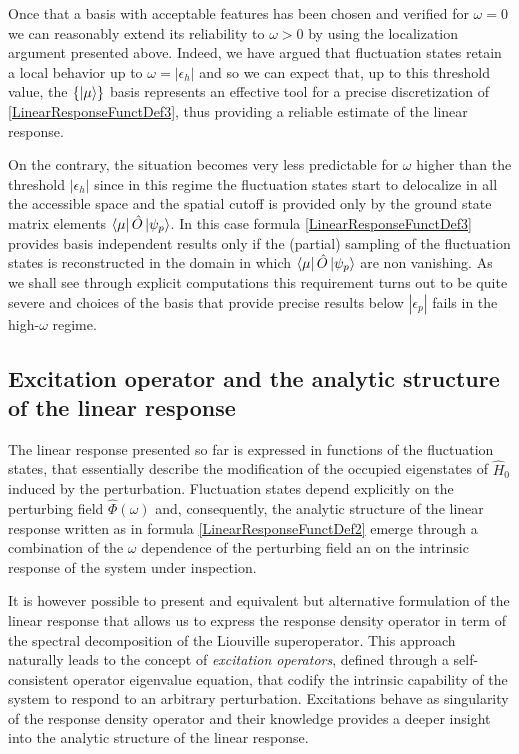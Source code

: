 \documentclass[a4paper]{article}
\newcommand{\eps}{\epsilon}
\newcommand{\op}[1]{\hat {#1}}
\newcommand{\hnot}{\op{H}_0}
\begin{document}
Once that a basis with acceptable features has been chosen and verified for $\omega=0$ we can reasonably extend its reliability to $\omega>0$ by using the localization argument presented above. 
Indeed, we have argued that fluctuation states retain a local behavior up to $\omega=|\eps_h|$ and so we can expect that, up to this threshold value, the $\{\ket{\mu}\}$ basis represents an 
effective tool for a precise discretization of \eqref{LinearResponseFunctDef3}, thus providing a reliable estimate of the linear response.  

On the contrary, the situation becomes very less predictable for $\omega$ higher than the threshold $|\eps_h|$ since in this regime the fluctuation states start to delocalize in all the 
accessible space and the spatial cutoff is provided only by the ground state matrix elements $\bra{\mu}\op O\ket{\psi_p}$.  
In this case formula \eqref{LinearResponseFunctDef3} provides basis independent results only if the (partial) sampling of the fluctuation states is reconstructed in the domain in which
$\bra{\mu}\op O\ket{\psi_p}$ are non vanishing. As we shall see through explicit computations this requirement turns out to be quite severe and choices of the basis that provide precise
results below $|\eps_p|$ fails in the high-$\omega$ regime.  

\subsection{Excitation operator and the analytic structure of the linear response}

The linear response presented so far is expressed in functions of the fluctuation states, that essentially describe the modification of the occupied eigenstates of $\hnot$ induced by 
the perturbation. Fluctuation states depend explicitly on the perturbing field $\op\Phi(\omega)$ and, consequently, the analytic structure of the linear response written as in formula 
\eqref{LinearResponseFunctDef2} emerge through a combination of the $\omega$ dependence of the perturbing field an on the intrinsic response of the system under inspection.    

It is however possible to present and equivalent but alternative formulation of the linear response that allows us to express the response density operator in term of the spectral
decomposition of the Liouville superoperator. This approach naturally leads to the concept of \emph{excitation operators}, defined through a self-consistent operator eigenvalue equation,
that codify the intrinsic capability of the system to respond to an arbitrary perturbation. Excitations behave as singularity of the response density operator and their knowledge provides a 
deeper insight into the analytic structure of the linear response. 
\end{document}
